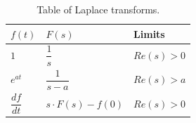 \begin{table}[H]
\center
\begin{tabular}{lll}
\hline
\multicolumn{1}{|l|}{$f(t)$}           & \multicolumn{1}{l|}{$F(s)$}                & \multicolumn{1}{l|}{Limits}    \\ \hline
\multicolumn{1}{|l|}{$1$}              & \multicolumn{1}{l|}{$\dfrac{1}{s}$}        & \multicolumn{1}{l|}{$Re(s)>0$} \\ \hline
\multicolumn{1}{|l|}{$e^{at}$}         & \multicolumn{1}{l|}{$\dfrac{1}{s-a}$}      & \multicolumn{1}{l|}{$Re(s)>a$} \\ \hline
\multicolumn{1}{|l|}{$\dfrac{df}{dt}$} & \multicolumn{1}{l|}{$s \cdot F(s) - f(0)$} & \multicolumn{1}{l|}{$Re(s)>0$} \\ \hline                          
\end{tabular}
\caption{Table of Laplace transforms.}
\label{lptable}
\end{table}

